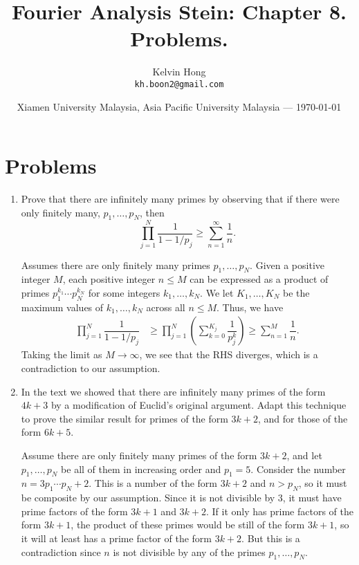 \documentclass{article}
\title{Fourier Analysis Stein: Chapter 8. Problems.} %
\author{Kelvin Hong\\ \texttt{kh.boon2@gmail.com}} %
\date{Xiamen University Malaysia, Asia Pacific University Malaysia --- \today} %
\begin{document}
\maketitle %

\section{Problems}

\begin{enumerate}
    \item Prove that there are infinitely many primes by observing that if there were only finitely many, $p_1, \dots, p_N$, then
    $$\prod_{j=1}^N \dfrac1{1-1/p_j} \geq \sum_{n=1}^\infty \dfrac1n.$$

    \begin{solution}
        Assumes there are only finitely many primes $p_1, \dots, p_N$.
        Given a positive integer $M$, each positive integer $n\leq M$ can be expressed as a product of primes $p_1^{k_1} \cdots p_N^{k_N}$ for some
        integers $k_1, \dots, k_N$.
        We let $K_1, \dots, K_N$ be the maximum values of $k_1, \dots, k_N$ across all $n\leq M$.
        Thus, we have 
        \begin{align*}
            \prod_{j=1}^N \dfrac1{1-1/p_j} &\geq \prod_{j=1}^N \left(\sum_{k=0}^{K_j} \dfrac1{p_j^k}\right) \geq \sum_{n=1}^M \dfrac1n.
        \end{align*}
        Taking the limit as $M\to\infty$, we see that the RHS diverges, which is a contradiction to our assumption.
    \end{solution}

    \item In the text we showed that there are infinitely many primes of the form $4k+3$ by a modification of Euclid's original argument.
    Adapt this technique to prove the similar result for primes of the form $3k+2$, and for those of the form $6k+5$.

    \begin{solution}
        Assume there are only finitely many primes of the form $3k+2$, and let $p_1, \dots, p_N$ be all of them in increasing order and $p_1=5$.
        Consider the number $n=3p_1\cdots p_N+2$. This is a number of the form $3k+2$ and $n>p_N$, so it must be composite by our assumption.
        Since it is not divisible by $3$, it must have prime factors of the form $3k+1$ and $3k+2$.
        If it only has prime factors of the form $3k+1$, the product of these primes would be still of the form $3k+1$, so it
        will at least has a prime factor of the form $3k+2$. But this is a contradiction since $n$ is not divisible by any of the primes $p_1, \dots, p_N$.


\end{solution}
\end{enumerate}
\end{document}
